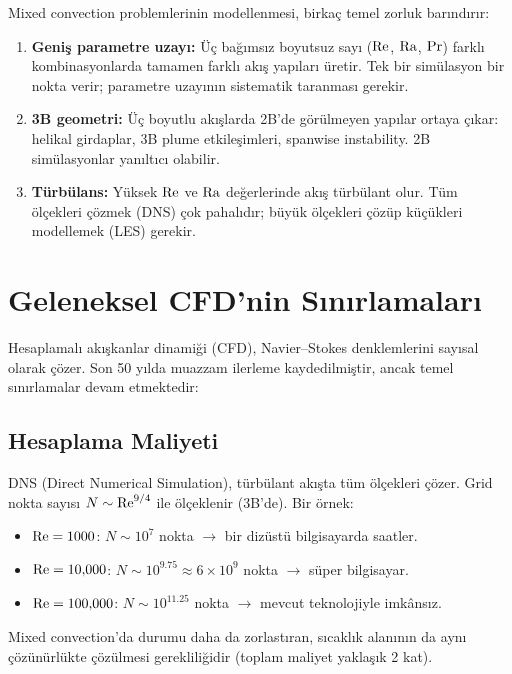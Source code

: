 Mixed convection problemlerinin modellenmesi, birkaç temel zorluk barındırır:

\begin{enumerate}
    \item \textbf{Geniş parametre uzayı:} Üç bağımsız boyutsuz sayı ($\mathrm{Re}$, $\mathrm{Ra}$, $\mathrm{Pr}$) farklı kombinasyonlarda tamamen farklı akış yapıları üretir. Tek bir simülasyon bir nokta verir; parametre uzayının sistematik taranması gerekir.

    \item \textbf{3B geometri:} Üç boyutlu akışlarda 2B'de görülmeyen yapılar ortaya çıkar: helikal girdaplar, 3B plume etkileşimleri, spanwise instability. 2B simülasyonlar yanıltıcı olabilir.

    \item \textbf{Türbülans:} Yüksek $\mathrm{Re}$ ve $\mathrm{Ra}$ değerlerinde akış türbülant olur. Tüm ölçekleri çözmek (DNS) çok pahalıdır; büyük ölçekleri çözüp küçükleri modellemek (LES) gerekir.
\end{enumerate}


\section{Geleneksel CFD'nin Sınırlamaları}
\label{sec:cfd_sinirlar}

Hesaplamalı akışkanlar dinamiği (CFD), Navier--Stokes denklemlerini sayısal olarak çözer. Son 50 yılda muazzam ilerleme kaydedilmiştir, ancak temel sınırlamalar devam etmektedir:

\subsection{Hesaplama Maliyeti}
DNS (Direct Numerical Simulation), türbülant akışta tüm ölçekleri çözer. Grid nokta sayısı $N \sim \mathrm{Re}^{9/4}$ ile ölçeklenir (3B'de). Bir örnek:
\begin{itemize}
    \item $\mathrm{Re} = 1000$: $N \sim 10^7$ nokta $\to$ bir dizüstü bilgisayarda saatler.
    \item $\mathrm{Re} = 10{,}000$: $N \sim 10^{9.75} \approx 6 \times 10^9$ nokta $\to$ süper bilgisayar.
    \item $\mathrm{Re} = 100{,}000$: $N \sim 10^{11.25}$ nokta $\to$ mevcut teknolojiyle imkânsız.
\end{itemize}
Mixed convection'da durumu daha da zorlastıran, sıcaklık alanının da aynı çözünürlükte çözülmesi gerekliliğidir (toplam maliyet yaklaşık 2 kat).

